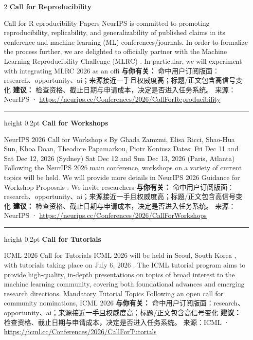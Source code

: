 \documentclass[10.5pt]{ctexart}
\begin{document}
\begin{multicols}{2}
{\large\bfseries Call for Reproducibility}\par
Call for R eproducibility Papers NeurIPS is committed to promoting reproducibility, replicability, and generalizability of published claims in its conference and machine learning (ML) conferences/journals. In order to formalize the process further, we are delighted to officially partner with the Machine Learning Reproducibility Challenge (MLRC) . In particular, we will experiment with integrating MLRC 2026 as an offi
\textbf{与你有关：} 命中用户订阅版面：research、opportunity、ai；来源接近一手且权威度高；标题/正文包含高信号变化
\textbf{建议：} 检查资格、截止日期与申请成本，决定是否进入任务系统。
{\footnotesize\color{ormuted} 来源：NeurIPS · \url{https://neurips.cc/Conferences/2026/CallForReproducibility}}
\vspace{2mm}
\hrule height 0.2pt
\vspace{2mm}
{\large\bfseries Call for Workshops}\par
NeurIPS 2026 Call for Workshop s By Ghada Zamzmi, Elisa Ricci, Shao-Hua Sun, Khoa Doan, Theodore Papamarkou, Piotr Koniusz Dates: Fri Dec 11 and Sat Dec 12, 2026 (Sydney) Sat Dec 12 and Sun Dec 13, 2026 (Paris, Atlanta) Following the NeurIPS 2026 main conference, workshops on a variety of current topics will be held. We will provide more details in NeurIPS 2026 Guidance for Workshop Proposals . We invite researchers 
\textbf{与你有关：} 命中用户订阅版面：research、opportunity、ai；来源接近一手且权威度高；标题/正文包含高信号变化
\textbf{建议：} 检查资格、截止日期与申请成本，决定是否进入任务系统。
{\footnotesize\color{ormuted} 来源：NeurIPS · \url{https://neurips.cc/Conferences/2026/CallForWorkshops}}
\vspace{2mm}
\hrule height 0.2pt
\vspace{2mm}
{\large\bfseries Call for Tutorials}\par
ICML 2026 Call for Tutorials ICML 2026 will be held in Seoul, South Korea , with tutorials taking place on July 6, 2026 . The ICML tutorial program aims to provide high-quality, in-depth presentations on topics of broad interest to the machine learning community, covering both foundational advances and emerging research directions. Mandatory Tutorial Topics Following an open call for community nominations, ICML 2026 
\textbf{与你有关：} 命中用户订阅版面：research、opportunity、ai；来源接近一手且权威度高；标题/正文包含高信号变化
\textbf{建议：} 检查资格、截止日期与申请成本，决定是否进入任务系统。
{\footnotesize\color{ormuted} 来源：ICML · \url{https://icml.cc/Conferences/2026/CallForTutorials}}

\end{multicols}
\end{document}
